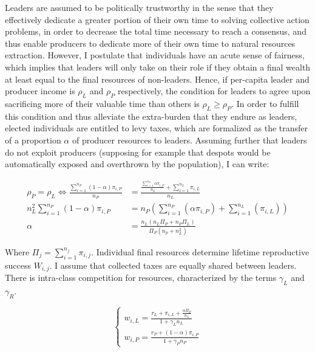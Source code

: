 \documentclass[a4paper]{article}
\begin{document}
Leaders are assumed to be politically trustworthy in the sense that they effectively dedicate a greater portion of their own time to solving collective action problems, in order to decrease the total time necessary to reach a consensus, and thus enable producers to dedicate more of their own time to natural resources extraction. However, I postulate that individuals have an acute sense of fairness, which implies that leaders will only take on their role if they obtain a final wealth at least equal to the final resources of non-leaders. Hence, if per-capita leader and producer income is $\rho_L$ and $\rho_P$ respectively, the condition for leaders to agree upon sacrificing more of their valuable time than others is $\rho_L\ge \rho_P$. In order to fulfill this condition and thus alleviate the extra-burden that they endure as leaders, elected individuals are entitled to levy taxes, which are formalized as the transfer of a proportion $\alpha$ of producer resources to leaders. Assuming further that leaders do not exploit producers (supposing for example that despots would be automatically exposed and overthrown by the population), I can write:

\begin{equation}
\begin{aligned}
\rho_P = \rho_L \Leftrightarrow\frac{\sum_{i=1}^{n_P}(1-\alpha)\pi_{i,P}}{n_P} &= \frac{\frac{\sum_{i=1}^{n_P}\alpha\pi_{i,P}}{n_L}+\sum_{i=1}^{n_L}\pi_{i,L}}{n_L}\\
n_L^2 \sum_{i=1}^{n_P}(1-\alpha)\pi_{i,P} &= n_P\left(\sum_{i=1}^{n_P}(\alpha\pi_{i,P}) + \sum_{i=1}^{n_L}(\pi_{i,L})\right)\\
\alpha &= \frac{n_L\left(n_L\Pi_P+n_P\Pi_L\right)}{\Pi_P\left(n_p+n_L^2\right)}
\end{aligned}
\end{equation}   

Where $\Pi_j=\sum_{i=1}^{n_j}\pi_{i,j}$. Individual final resources determine lifetime reproductive success $W_{i,j}$. I assume that collected taxes are equally shared between leaders. There is intra-class competition for resources, characterized by the terms $\gamma_L$ and $\gamma_R$.

\begin{equation}
\begin{cases}
w_{i,L}=\frac{r_L+\pi_{i,L}+\frac{\alpha\Pi_P}{n_L}}{1+\gamma_L n_L}\\
w_{i,P}=\frac{r_P+(1-\alpha)\pi_{i,P}}{1+\gamma_P n_P}
\end{cases}
\end{equation}
\end{document}
